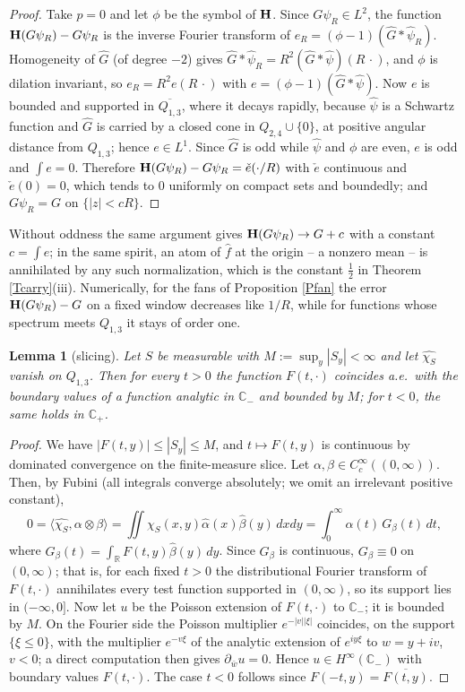 \documentclass{article}
\newtheorem{lemma}{Lemma}
\def\H{{\bf H}}
\def\R{{\mathbb R}}
\def\C{{\mathbb C}}
\begin{document}
	\begin{proof}
		Take $p=0$ and let $\phi$ be the symbol of $\H$. Since $G\psi_R\in L^2$, the function $\H(G\psi_R)-G\psi_R$ is the inverse Fourier transform of $e_R=(\phi-1)(\hat G*\hat\psi_R)$. Homogeneity of $\hat G$ (of degree $-2$) gives $\hat G*\hat\psi_R=R^2(\hat G*\hat\psi)(R\,\cdot)$, and $\phi$ is dilation invariant, so $e_R=R^2e(R\,\cdot)$ with $e=(\phi-1)(\hat G*\hat\psi)$. Now $e$ is bounded and supported in $\overline{Q_{1,3}}$, where it decays rapidly, because $\hat\psi$ is a Schwartz function and $\hat G$ is carried by a closed cone in $Q_{2,4}\cup\{0\}$, at positive angular distance from $Q_{1,3}$; hence $e\in L^1$. Since $\hat G$ is odd while $\hat\psi$ and $\phi$ are even, $e$ is odd and $\int e=0$. Therefore $\H(G\psi_R)-G\psi_R=\check e(\cdot/R)$ with $\check e$ continuous and $\check e(0)=0$, which tends to $0$ uniformly on compact sets and boundedly; and $G\psi_R=G$ on $\{|z|<cR\}$.
	\end{proof}

	Without oddness the same argument gives $\H(G\psi_R)\to G+c$ with a constant $c=\int e$; in the same spirit, an atom of $\hat f$ at the origin -- a nonzero mean -- is annihilated by any such normalization, which is the constant $\frac12$ in Theorem \ref{Tcarry}(iii). Numerically, for the fans of Proposition \ref{Pfan} the error $\H(G\psi_R)-G$ on a fixed window decreases like $1/R$, while for functions whose spectrum meets $Q_{1,3}$ it stays of order one.

	\begin{lemma}[slicing]\label{Lslice}
		Let $S$ be measurable with $M:=\sup_y|S_y|<\infty$ and let $\widehat{\chi_S}$ vanish on $Q_{1,3}$. Then for every $t>0$ the function $F(t,\cdot)$ coincides a.e.\ with the boundary values of a function analytic in $\C_-$ and bounded by $M$; for $t<0$, the same holds in $\C_+$.
	\end{lemma}

	\begin{proof}
		We have $|F(t,y)|\leq|S_y|\leq M$, and $t\mapsto F(t,y)$ is continuous by dominated convergence on the finite-measure slice. Let $\alpha,\beta\in C^\infty_c((0,\infty))$. Then, by Fubini (all integrals converge absolutely; we omit an irrelevant positive constant),
		$$0=\langle\widehat{\chi_S},\alpha\otimes\beta\rangle=\iint\chi_S(x,y)\hat\alpha(x)\hat\beta(y)\,dxdy=\int_0^\infty\alpha(t)\,G_\beta(t)\,dt,$$
		where $G_\beta(t)=\int_\R F(t,y)\hat\beta(y)\,dy$.
		Since $G_\beta$ is continuous, $G_\beta\equiv 0$ on $(0,\infty)$; that is, for each fixed $t>0$ the distributional Fourier transform of $F(t,\cdot)$ annihilates every test function supported in $(0,\infty)$, so its support lies in $(-\infty,0]$. Now let $u$ be the Poisson extension of $F(t,\cdot)$ to $\C_-$; it is bounded by $M$. On the Fourier side the Poisson multiplier $e^{-|v||\xi|}$ coincides, on the support $\{\xi\leq 0\}$, with the multiplier $e^{-v\xi}$ of the analytic extension of $e^{iy\xi}$ to $w=y+iv$, $v<0$; a direct computation then gives $\partial_{\bar w}u=0$. Hence $u\in H^\infty(\C_-)$ with boundary values $F(t,\cdot)$. The case $t<0$ follows since $F(-t,y)=\overline{F(t,y)}$.
	\end{proof}
\end{document}

